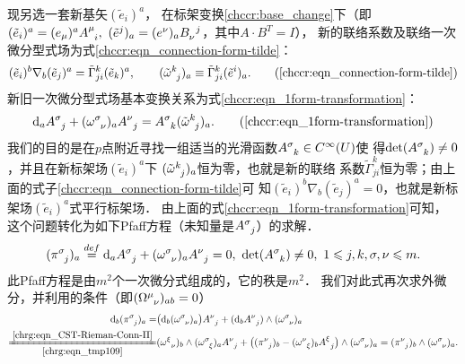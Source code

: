 现另选一套新基矢$(\tilde{e}_i)^a$，
在标架变换\eqref{chccr:base_change}下（即$(\tilde{e} _i)^a = (e_\mu)^{a} A_{\hphantom{\mu} i}^{\mu},\
(\tilde{e} ^j)_a = (e^\nu)_{a} B^{\hphantom{\mu} j}_{\nu}$，其中$A\cdot B^T=I$），
新的联络系数及联络一次微分型式场为式\eqref{chccr:eqn_connection-form-tilde}：
\begin{equation}
    (\tilde{e}_i)^b \nabla _b (\tilde{e}_j)^a  =
    \tilde{\Gamma}^{k}_{ji} (\tilde{e}_k)^a,   \qquad
    (\tilde{\omega} _{\hphantom{k} j}^{k})_a  \equiv
    \tilde{\Gamma}^{k}_{j i} (\tilde{e}^i)_a .
    \tag{\ref{chccr:eqn_connection-form-tilde}}
\end{equation}
新旧一次微分型式场基本变换关系为式\eqref{chccr:eqn_1form-transformation}：
\begin{equation}
    {\rm d}_a A_{\hphantom{\mu} j}^{\sigma} + (\omega ^{\sigma}_{\hphantom{\mu}\nu})_a  A_{\hphantom{\mu} j}^{\nu}
    =  A_{\hphantom{\mu} k}^{\sigma} (\tilde{\omega} _{\hphantom{k} j} ^{k})_a .
    \tag{\ref{chccr:eqn_1form-transformation}}
\end{equation}
我们的目的是在$p$点附近寻找一组适当的光滑函数$A_{\hphantom{\mu} k}^{\sigma}\in C^\infty(U)$使
得$\det(A_{\hphantom{\mu} k}^{\sigma})\neq 0$，并且在新标架场$(\tilde{e}_i)^a$下
\CJKunderwave{新一次联络型式场}$(\tilde{\omega} _{\hphantom{k} j} ^{k})_a $恒为零，也就是新的联络
系数$\tilde{\Gamma}^{k}_{j i}$恒为零；由上面的式子\eqref{chccr:eqn_connection-form-tilde}可
知$(\tilde{e}_i)^b \nabla _b (\tilde{e}_j)^a=0$，也就是新标架场$(\tilde{e}_i)^a$式平行标架场．
由上面的式\eqref{chccr:eqn_1form-transformation}可知，
这个问题转化为如下Pfaff方程（未知量是$A_{\hphantom{\mu} j}^{\sigma}$）的求解．
\begin{equation}\label{chrg:eqn_tmp109}
    (\pi _{\hphantom{\mu} j} ^{\sigma})_a \overset{def}{=}
    {\rm d}_a A_{\hphantom{\mu} j}^{\sigma} + (\omega ^{\sigma}_{\hphantom{\mu}\nu})_a  A_{\hphantom{\mu} j}^{\nu}=0,
    \ \det(A_{\hphantom{\mu} k}^{\sigma})\neq 0,\ 1 \leqslant j,k,\sigma,\nu \leqslant m .
\end{equation}
此Pfaff方程是由$m^2$个一次微分式组成的，它的秩是$m^2$．
我们对此式再次求外微分，并利用的条件（即$(\Omega_{\hphantom{\mu} \nu} ^{\mu})_{ab}=0$）
\begin{align*}
    {\rm d}_b(\pi _{\hphantom{\mu} j} ^{\sigma})_a =&
       \bigl({\rm d}_b (\omega ^{\sigma}_{\hphantom{\mu}\nu})_a\bigr)  A_{\hphantom{\mu} j}^{\nu}
      + ({\rm d}_b  A_{\hphantom{\mu} j}^{\nu}) \wedge (\omega ^{\sigma}_{\hphantom{\mu}\nu})_a   \\
    \xlongequal[\ref{chrg:eqn_tmp109}]{\ref{chrg:eqn_CST-Rieman-Conn-II}}&
    ( \omega _{\hphantom{\mu} \nu}^\xi )_b \wedge ( \omega _{\hphantom{\mu} \xi}^{\sigma} )_a  A_{\hphantom{\mu} j}^{\nu}
    + \bigl((\pi _{\hphantom{\mu} j} ^{\nu})_b-(\omega ^{\nu}_{\hphantom{\mu}\xi})_b  A_{\hphantom{\mu} j}^{\xi}\bigr)
     \wedge (\omega ^{\sigma}_{\hphantom{\mu}\nu})_a
     =(\pi _{\hphantom{\mu} j} ^{\nu})_b \wedge (\omega ^{\sigma}_{\hphantom{\mu}\nu})_a  .
\end{align*}
